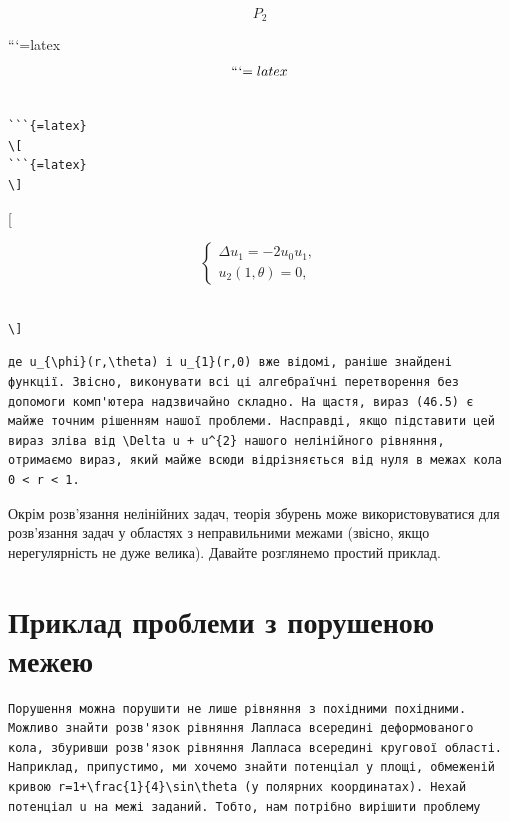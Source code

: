 \documentclass[
]{article}
\begin{document}
\[
P_{2}
\]

```{=latex}
\[
```{=latex}
\]

\begin{verbatim}

```{=latex}
\[
```{=latex}
\]
\end{verbatim}

{[}

\[
\begin{cases} \Delta u_{1} = -2u_{0}u_{1}, \\ u_{2}(1, \theta) = 0, \end{cases}
\]

\begin{verbatim}

\]
\end{verbatim}

\begin{verbatim}
де u_{\phi}(r,\theta) і u_{1}(r,0) вже відомі, раніше знайдені функції. Звісно, виконувати всі ці алгебраїчні перетворення без допомоги комп'ютера надзвичайно складно. На щастя, вираз (46.5) є майже точним рішенням нашої проблеми. Насправді, якщо підставити цей вираз зліва від \Delta u + u^{2} нашого нелінійного рівняння, отримаємо вираз, який майже всюди відрізняється від нуля в межах кола 0 < r < 1.
\end{verbatim}

Окрім розв'язання нелінійних задач, теорія збурень може
використовуватися для розв'язання задач у областях з неправильними
межами (звісно, якщо нерегулярність не дуже велика). Давайте розглянемо
простий приклад.

\section{Приклад проблеми з порушеною
межею}\label{ux43fux440ux438ux43aux43bux430ux434-ux43fux440ux43eux431ux43bux435ux43cux438-ux437-ux43fux43eux440ux443ux448ux435ux43dux43eux44e-ux43cux435ux436ux435ux44e}

\begin{verbatim}
Порушення можна порушити не лише рівняння з похідними похідними. Можливо знайти розв'язок рівняння Лапласа всередині деформованого кола, збуривши розв'язок рівняння Лапласа всередині кругової області. Наприклад, припустимо, ми хочемо знайти потенціал у площі, обмеженій кривою r=1+\frac{1}{4}\sin\theta (у полярних координатах). Нехай потенціал u на межі заданий. Тобто, нам потрібно вирішити проблему
\end{verbatim}
\end{document}
